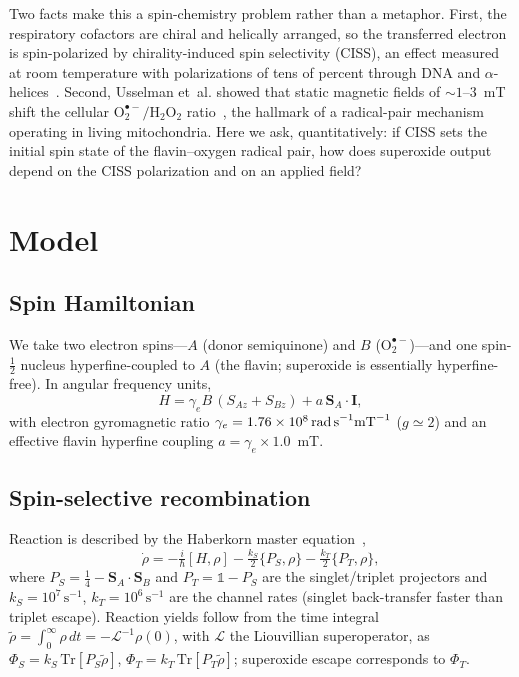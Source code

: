 \documentclass[11pt,a4paper]{article}
\begin{document}
Two facts make this a spin-chemistry problem rather than a metaphor.
First, the respiratory cofactors are chiral and helically arranged, so the
transferred electron is spin-polarized by chirality-induced spin
selectivity (CISS), an effect measured at room temperature with
polarizations of tens of percent through DNA and
$\alpha$-helices~\cite{naaman,waldeck}. Second, Usselman et~al. showed that
static magnetic fields of $\sim\!1$--$3$~mT shift the cellular
$\text{O}_2^{\bullet-}/\text{H}_2\text{O}_2$ ratio~\cite{usselman}, the
hallmark of a radical-pair mechanism operating in living mitochondria.
Here we ask, quantitatively: if CISS sets the initial spin state of the
flavin--oxygen radical pair, how does superoxide output depend on the CISS
polarization and on an applied field?

\section{Model}
\subsection{Spin Hamiltonian}
We take two electron spins---$A$ (donor semiquinone) and $B$
($\text{O}_2^{\bullet-}$)---and one spin-$\tfrac12$ nucleus hyperfine-coupled
to $A$ (the flavin; superoxide is essentially hyperfine-free). In angular
frequency units,
\begin{equation}
  H = \gamma_e B\,(S_{Az}+S_{Bz})
    + a\,\bm{S}_A\!\cdot\!\bm{I},
\end{equation}
with electron gyromagnetic ratio
$\gamma_e = 1.76\times10^{8}\,\text{rad\,s}^{-1}\text{mT}^{-1}$ ($g\simeq2$)
and an effective flavin hyperfine coupling $a = \gamma_e\times1.0$~mT.

\subsection{Spin-selective recombination}
Reaction is described by the Haberkorn master equation~\cite{haberkorn},
\begin{equation}
  \dot\rho = -\tfrac{i}{\hbar}[H,\rho]
    - \tfrac{k_S}{2}\{P_S,\rho\}
    - \tfrac{k_T}{2}\{P_T,\rho\},
\end{equation}
where $P_S=\tfrac14-\bm{S}_A\!\cdot\!\bm{S}_B$ and $P_T=\mathbb{1}-P_S$ are
the singlet/triplet projectors and $k_S=10^{7}\,\text{s}^{-1}$,
$k_T=10^{6}\,\text{s}^{-1}$ are the channel rates (singlet back-transfer
faster than triplet escape). Reaction yields follow from the time integral
$\tilde\rho=\int_0^\infty\!\rho\,dt=-\mathcal{L}^{-1}\rho(0)$, with
$\mathcal{L}$ the Liouvillian superoperator, as
$\Phi_S=k_S\,\mathrm{Tr}[P_S\tilde\rho]$,
$\Phi_T=k_T\,\mathrm{Tr}[P_T\tilde\rho]$; superoxide escape corresponds to
$\Phi_T$.
\end{document}

